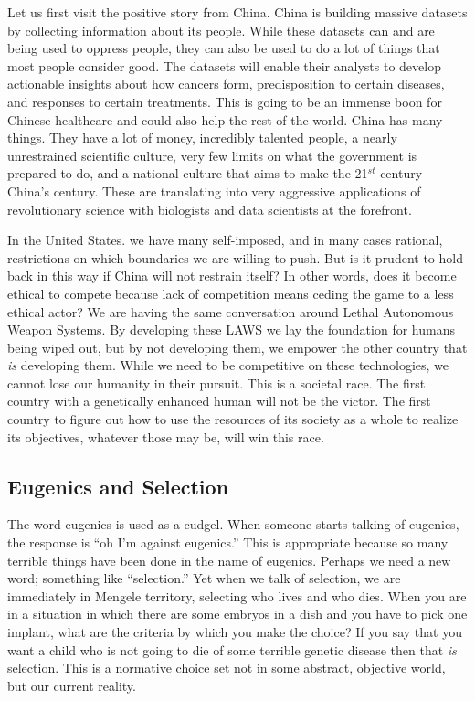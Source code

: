Let us first visit the positive story from China.
China is building massive datasets by collecting information about its people.
While these datasets can and are being used to oppress people, they can also be used to do a lot of things that most people consider good.
The datasets will enable their analysts to develop actionable insights about how cancers form, predisposition to certain diseases, and responses to certain treatments.
This is going to be an immense boon for Chinese healthcare and could also help the rest of the world.
China has many things.
They have a lot of money, incredibly talented people, a nearly unrestrained scientific culture, very few limits on what the government is prepared to do, and a national culture that aims to make the 21$^{st}$ century China's century.
These are translating into very aggressive applications of revolutionary science with biologists and data scientists at the forefront.

In the United States. we have many self-imposed, and in many cases rational, restrictions on which boundaries we are willing to push.
But is it prudent to hold back in this way if China will not restrain itself?
In other words, does it become ethical to compete because lack of competition means ceding the game to a less ethical actor?
We are having the same conversation around Lethal Autonomous Weapon Systems.
By developing these LAWS we lay the foundation for humans being wiped out, but by not developing them, we empower the other country that \textit{is} developing them.
While we need to be competitive on these technologies, we cannot lose our humanity in their pursuit.
This is a societal race.
The first country with a genetically enhanced human will not be the victor.
The first country to figure out how to use the resources of its society as a whole to realize its objectives, whatever those may be, will win this race.

\subsection{Eugenics and Selection}

The word eugenics is used as a cudgel.
When someone starts talking of eugenics, the response is ``oh I'm against eugenics.''
This is appropriate because so many terrible things have been done in the name of eugenics.
Perhaps we need a new word; something like ``selection.''
Yet when we talk of selection, we are immediately in Mengele territory, selecting who lives and who dies.
When you are in a situation in which there are some embryos in a dish and you have to pick one implant, what are the criteria by which you make the choice?
If you say that you want a child who is not going to die of some terrible genetic disease then that \textit{is} selection.
This is a normative choice set not in some abstract, objective world, but our current reality.

